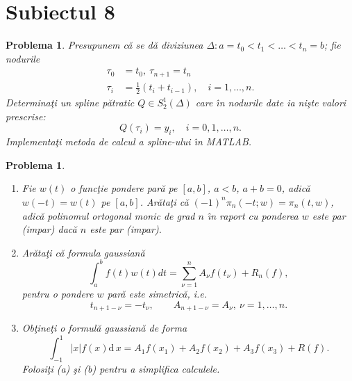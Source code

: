 \documentclass[12pt]{article}%
\newtheorem{problem}[theorem]{Problema}
\begin{document}
\newpage

\section*{Subiectul 8}

\begin{problem}
\label{Subbotinspline}Presupunem c\u{a} se d\u{a} diviziunea $\Delta
:a=t_{0}<t_{1}<\dots<t_{n}=b$; fie nodurile
\begin{align*}
\tau_{0}  &  =t_{0},~\tau_{n+1}=t_{n}\\
\tau_{i}  &  =\frac{1}{2}\left(  t_{i}+t_{i-1}\right)  ,\quad i=1,\dots,n.
\end{align*}
Determina\c{t}i un spline p\u{a}tratic $Q\in S_{2}^{1}(\Delta)$ care \^{\i}n
nodurile date ia ni\c{s}te valori prescrise:%
\[
Q(\tau_{i})=y_{i},\quad i=0,1,\dots,n.
\]
Implementa\c{t}i metoda de calcul a spline-ului \^{\i}n MATLAB.
\end{problem}

\begin{problem}
\label{pb4.37b} 

\begin{enumerate}


\item[(a)] Fie $w(t)$ o func\c{t}ie pondere par\u{a} pe $[a,b]$, $a<b$,
$a+b=0$, adic\u{a} $w(-t)=w(t)$ pe $[a,b]$. Ar\u{a}ta\c{t}i c\u{a}
$(-1)^{n}\pi_{n}(-t;w)=\pi_{n}(t,w)$, adic\u{a} polinomul ortogonal monic de
grad $n$ \^{\i}n raport cu ponderea $w$ este par (impar) dac\u{a} $n$ este par (impar).

\item[(b)] Ar\u{a}ta\c{t}i c\u{a} formula gaussian\u{a}
\[
\int_{a}^{b}f(t)w(t)dt=\sum_{\nu=1}^{n}A_{\nu}f(t_{\nu})+R_{n}(f),
\]
pentru o pondere $w$ par\u{a} este simetric\u{a}, i.e.
\[
t_{n+1-\nu}=-t_{\nu},\qquad A_{n+1-\nu}=A_{\nu},~\nu=1,\dots,n.
\]


\item[(c)] Ob\c{t}ine\c{t}i o formul\u{a} gaussian\u{a} de forma%
\[
\int_{-1}^{1}\left\vert x\right\vert f(x)\mathrm{d}\,x=A_{1}f(x_{1}%
)+A_{2}f(x_{2})+A_{3}f(x_{3})+R(f).
\]
Folosi\c{t}i (a) \c{s}i (b) pentru a simplifica calculele. 
\end{enumerate}
\end{problem}
\end{document}
